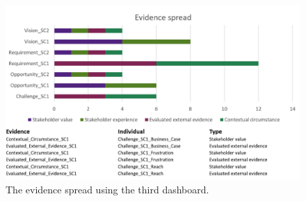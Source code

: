 \begin{figure}[H]
\centering
  \includegraphics[width=16cm]{../../Images/05_Validation/05_RP_Dashboard_Component_3_RP_SC1_Spread.png}
  \caption{The evidence spread using the third dashboard.}
  \label{fig:05_RP_Dashboard_Component_3_RP_SC2_Spread}
\end{figure}